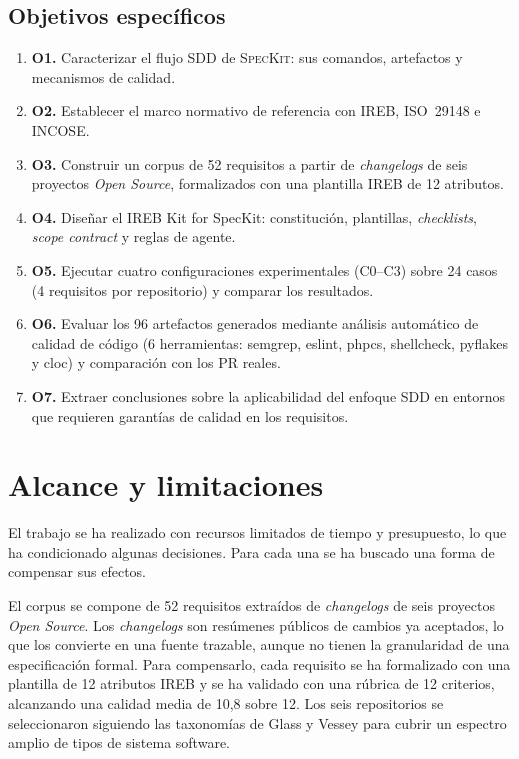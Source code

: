 \subsection{Objetivos espec\'ificos}

\begin{enumerate}
    \item \textbf{O1.} Caracterizar el flujo SDD de \textsc{SpecKit}: sus comandos, artefactos y mecanismos de calidad.
    \item \textbf{O2.} Establecer el marco normativo de referencia con IREB, ISO~29148 e INCOSE.
    \item \textbf{O3.} Construir un corpus de 52 requisitos a partir de \emph{changelogs} de seis proyectos \emph{Open Source}, formalizados con una plantilla IREB de 12 atributos.
    \item \textbf{O4.} Dise\~nar el IREB Kit for SpecKit: constituci\'on, plantillas, \emph{checklists}, \emph{scope contract} y reglas de agente.
    \item \textbf{O5.} Ejecutar cuatro configuraciones experimentales (C0--C3) sobre 24 casos (4 requisitos por repositorio) y comparar los resultados.
    \item \textbf{O6.} Evaluar los 96 artefactos generados mediante an\'alisis autom\'atico de calidad de c\'odigo (6 herramientas: semgrep, eslint, phpcs, shellcheck, pyflakes y cloc) y comparaci\'on con los PR reales.
    \item \textbf{O7.} Extraer conclusiones sobre la aplicabilidad del enfoque SDD en entornos que requieren garant\'ias de calidad en los requisitos.
\end{enumerate}

\section{Alcance y limitaciones}

El trabajo se ha realizado con recursos limitados de tiempo y presupuesto, lo que ha condicionado algunas decisiones. Para cada una se ha buscado una forma de compensar sus efectos.

El corpus se compone de 52 requisitos extra\'idos de \emph{changelogs} de seis proyectos \emph{Open Source}. Los \emph{changelogs} son res\'umenes p\'ublicos de cambios ya aceptados, lo que los convierte en una fuente trazable, aunque no tienen la granularidad de una especificaci\'on formal. Para compensarlo, cada requisito se ha formalizado con una plantilla de 12 atributos IREB y se ha validado con una r\'ubrica de 12 criterios, alcanzando una calidad media de 10{,}8 sobre 12. Los seis repositorios se seleccionaron siguiendo las taxonom\'ias de Glass y Vessey para cubrir un espectro amplio de tipos de sistema software.

